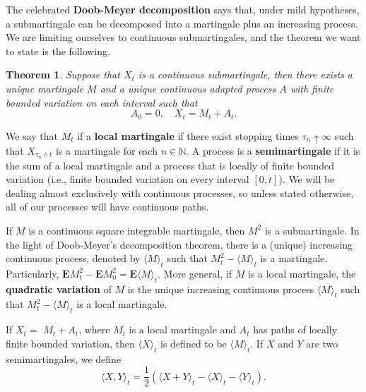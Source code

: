 \documentclass[twoside, 12pt]{book}
\numberwithin{equation}{chapter}
\newtheorem{theorem}{Theorem}[section]
\def\mN{{\mathbb N}}
\def\bE{{\mathbf E}}
\def\<{\langle}
\def\>{\rangle}
\begin{document}
	The celebrated {\bf Doob-Meyer decomposition} says that, under mild hypotheses, a submartingale can be decomposed into a martingale plus an increasing process. We are limiting ourselves to continuous submartingales, and the theorem we want to state is the following.
	
	\begin{theorem}
		Suppose that $X_t$ is a continuous submartingale, then there exists a unique martingale $M$ and a unique continuous adapted process $A$ with finite bounded variation on each interval such that 
		\[
		A_0=0, \quad X_t= M_t+A_t. 
		\]
	\end{theorem}
	
	\medspace
	
	We say that $M_t$ if a {\bf local martingale} if there exist stopping times $\tau_n\uparrow \infty$ such that $X_{\tau_n\wedge t}$ is a martingale for each $n\in \mN$. A process is a {\bf semimartingale} if it is the sum of a local martingale and a process that is locally of finite bounded variation (i.e., finite bounded variation on every interval $[0,t]$). We will be dealing almost exclusively with continuous processes, so unless stated otherwise, all of our processes will have continuous paths. 
	
	If $M$ is a continuous square integrable martingale, then $M^2$ is a submartingale.  In the light of {Doob-Meyer's decomposition} theorem, there is a (unique) increasing continuous process, denoted by $\<M\>_t$ such that $M^2_t-\<M\>_t$ is a martingale. Particularly, $\bE M_t^2 - \bE M_0^2 = \bE \langle M \rangle_t$.  More general, if $M$ is a local martingale, the {\bf quadratic variation} of $M$ is the unique increasing continuous process $\<M\>_t$ such that $M^2_t-\<M\>_t$ is a local martingale.  
	
	 
	 If $X_t=$ $M_t+A_t$, where $M_t$ is a local martingale and $A_t$ has paths of locally finite bounded variation, then $\langle X\rangle_t$ is defined to be $\langle M\rangle_t$. If $X$ and $Y$ are two semimartingales, we define
	$$
	    \langle X, Y\rangle_t=\frac{1}{2}\left(\langle X+Y\rangle_t-\langle X\rangle_t-\langle Y\rangle_t\right). 
	$$
	
\end{document}
